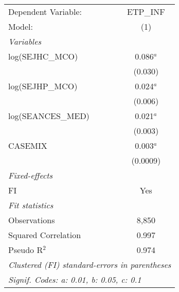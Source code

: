 
\begingroup
\centering
\begin{tabular}{lc}
   \tabularnewline \midrule \midrule
   Dependent Variable: & ETP\_INF\\   
   Model:              & (1)\\  
   \midrule
   \emph{Variables}\\
   log(SEJHC\_MCO)     & 0.086$^{a}$\\   
                       & (0.030)\\   
   log(SEJHP\_MCO)     & 0.024$^{a}$\\   
                       & (0.006)\\   
   log(SEANCES\_MED)   & 0.021$^{a}$\\   
                       & (0.003)\\   
   CASEMIX             & 0.003$^{a}$\\   
                       & (0.0009)\\   
   \midrule
   \emph{Fixed-effects}\\
   FI                  & Yes\\  
   \midrule
   \emph{Fit statistics}\\
   Observations        & 8,850\\  
   Squared Correlation & 0.997\\  
   Pseudo R$^2$        & 0.974\\  
   \midrule \midrule
   \multicolumn{2}{l}{\emph{Clustered (FI) standard-errors in parentheses}}\\
   \multicolumn{2}{l}{\emph{Signif. Codes: a: 0.01, b: 0.05, c: 0.1}}\\
\end{tabular}
\par\endgroup


